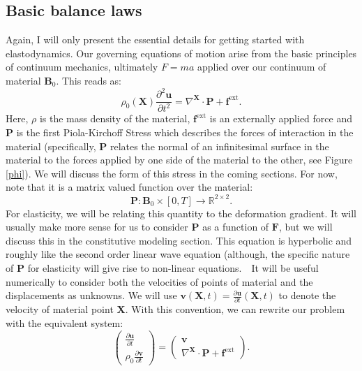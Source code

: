 \documentclass[article]{pcms-l}
\begin{document}
\subsection*{Basic balance laws}
Again, I will only present the essential details for getting started with elastodynamics. Our governing equations of motion arise from the basic principles of continuum mechanics, ultimately $F=ma$ applied over our continuum of material $\mathbf{B}_0$. This reads as:
$$
\rho_0(\mathbf{X})\frac{\partial^2\mathbf{u}}{\partial{t}^2}=\nabla^\mathbf{X}\cdot\mathbf{P}+\mathbf{f}^{\textrm{ext}}.
$$
Here, $\rho$ is the mass density of the material, $\mathbf{f}^\textrm{ext}$ is an externally applied force and $\mathbf{P}$ is the first Piola-Kirchoff Stress which describes the forces of interaction in the material (specifically, $\mathbf{P}$ relates the normal of an infinitesimal surface in the material to the forces applied by one side of the material to the other, see Figure \ref{phi}). We will discuss the form of this stress in the coming sections. For now, note that it is a matrix valued function over the material:
$$
\mathbf{P}:\mathbf{B}_0\times[0,T]\rightarrow\mathbb{R}^{2\times2}.
$$
For elasticity, we will be relating this quantity to the deformation gradient. It will usually make more sense for us to consider $\mathbf{P}$ as a function of $\mathbf{F}$, but we will discuss this in the constitutive modeling section. This equation is hyperbolic and roughly like the second order linear wave equation (although, the specific nature of $\mathbf{P}$ for elasticity will give rise to non-linear equations.\
\
It will be useful numerically to consider both the velocities of points of material and the displacements as unknowns. We will use $\mathbf{v}(\mathbf{X},t)=\frac{\partial\mathbf{u}}{\partial{t}}(\mathbf{X},t)$ to denote the velocity of material point $\mathbf{X}$. With this convention, we can rewrite our problem with the equivalent system:
$$
\left(\begin{array}{c}
\frac{\partial\mathbf{u}}{\partial{t}} \\
\rho_0\frac{\partial\mathbf{v}}{\partial{t}} \end{array}\right)=\left(\begin{array}{c}
\mathbf{v} \\
\nabla^\mathbf{X}\cdot\mathbf{P}+\mathbf{f}^{\textrm{ext}} \end{array}\right).
$$
\end{document}
